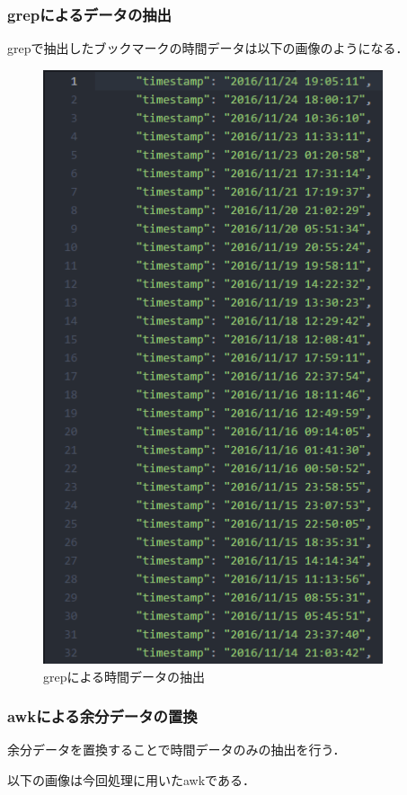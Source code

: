 \newpage

\subsubsection{grepによるデータの抽出}
grepで抽出したブックマークの時間データは以下の画像のようになる．

\begin{figure}[htb]
\centering
\includegraphics[width=10cm]{timestamps.PNG}
\caption{grepによる時間データの抽出}\label{excel7}
\end{figure}

\newpage

\subsubsection{awkによる余分データの置換}
余分データを置換することで時間データのみの抽出を行う．\par
以下の画像は今回処理に用いたawkである．

